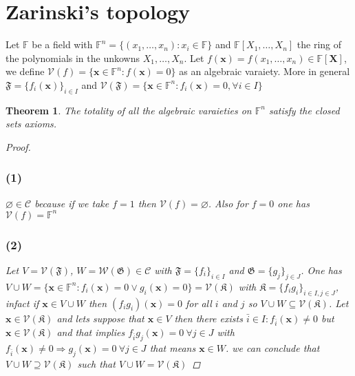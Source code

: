 \documentclass{article}
\newtheorem{theorem}{Theorem}
\begin{document}
    \section*{Zarinski's topology}
        Let $\mathbb{F}$ be a field with $\mathbb{F}^n = \{ (x_1,\dots,x_n) : x_i \in \mathbb{F} \} $ and $\mathbb{F}[X_1,\dots, X_n]$ the ring of the polynomials in the unkowns $X_1,\dots,X_n$. Let $f(\textbf{x}) = f(x_1,\dots,x_n) \in \mathbb{F}[\textbf{X}]$, we define $\mathcal{V}(f) = \{ \textbf{x} \in \mathbb{F}^n : f(\textbf{x}) = 0\}$ as an algebraic varaiety. More in general $\mathfrak{F} = \{ f_i(\textbf{x}) \}_{i \in I}$ and  $\mathcal{V}(\mathfrak{F}) = \{ \textbf{x} \in \mathbb{F}^n : f_i(\textbf{x}) = 0, \forall i\in I \}$
        \begin{theorem}
            The totality of all the algebraic varaieties on $\mathbb{F}^n$ satisfy the closed sets axioms.
            \begin{proof}
                \subsubsection*{(1)}
                    $\varnothing \in \mathcal{C}$ because  if we take $f = 1$ then $\mathcal{V}(f) = \varnothing$. Also for $f = 0$ one has $\mathcal{V}(f) = \mathbb{F}^n$
                \subsubsection*{(2)}
                    Let $V = \mathcal{V}(\mathfrak{F})$, $W = \mathcal{W}(\mathfrak{G}) \in \mathcal{C}$ with $\mathfrak{F} = \{ f_i \}_{i\in I}$ and $\mathfrak{G} = \{ g_j \}_{j\in J}$.
                    One has $V \cup W = \{ \textbf{x} \in \mathbb{F}^n : f_i(\textbf{x}) = 0 \vee g_i(\textbf{x}) = 0 \} = \mathcal{V}(\mathfrak{K})$ with $\mathfrak{K} = \{ f_ig_i \}_{i \in I,j\in J}$, infact if $\textbf{x} \in V \cup W$ then $(f_ig_i)(\textbf{x}) = 0$ for all $i$ and $j$ so $V \cup W \subseteq \mathcal{V}(\mathfrak{K})$.
                    Let $\textbf{x} \in \mathcal{V}(\mathfrak{K})$ and lets suppose that $\textbf{x} \in V$ then there exists $\bar{i} \in I : f_{\bar{i}}(\textbf{x}) \neq 0$ but $\textbf{x} \in \mathcal{V}(\mathfrak{K})$ and that implies $f_{\bar{i}}g_j(\textbf{x}) = 0 \ \forall j \in J$ with $f_{\bar{i}}(\textbf{x}) \neq 0 \Rightarrow g_j(\textbf{x}) = 0 \ \forall j\in J$ that means $\textbf{x} \in W$. we can conclude that $V \cup W \supseteq \mathcal{V}(\mathfrak{K})$ such that $V \cup W = \mathcal{V}(\mathfrak{K})$

\end{proof}
\end{theorem}
\end{document}
